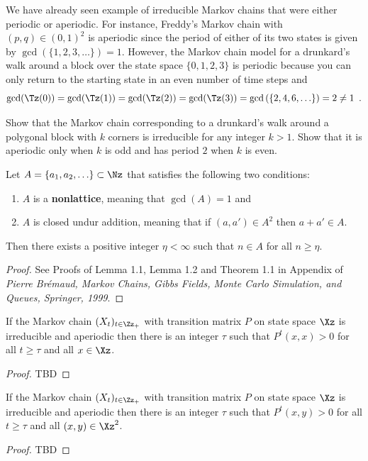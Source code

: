 We have already seen example of irreducible Markov chains that  were either periodic or aperiodic.  For instance, Freddy's Markov chain with $(p,q) \in (0,1)^2$ is aperiodic since the period of either of its two states is given by $\gcd(\{1,2,3,\ldots\})=1$.  However, the Markov chain model for a drunkard's walk around a block over the state space $\{0,1,2,3\}$ %
is periodic because you can only return to the starting state in an even number of time steps and 
$$
\gcd(\Tz(0))=\gcd(\Tz(1))=\gcd(\Tz(2))=\gcd(\Tz(3))= \gcd \left( \{2,4,6,\ldots\} \right) =2 \neq 1 \enspace .
$$

\begin{exercise}\label{EXR:DrunkardsWalkOnKGonIrredAperiod}
Show that the Markov chain corresponding to a drunkard's walk around a polygonal block with $k$ corners is irreducible for any integer $k>1$.  Show that it is aperiodic only when $k$ is odd and has period $2$ when $k$ is even.
\end{exercise}

\begin{prop}\label{P:AdditionNonlattice} Let $A=\{a_1,a_2,\ldots\} \subset \Nz$ that satisfies the following two conditions:
\begin{enumerate}
\item $A$ is a {\bf nonlattice}, meaning that $\gcd(A)=1$ and
\item $A$ is closed undur addition, meaning that if $(a,a') \in A^2$ then $a+a' \in A$.
\end{enumerate}
Then there exists a positive integer $\eta < \infty$ such that $n \in A$ for all $n \geq \eta$.
\begin{proof}
See Proofs of Lemma 1.1, Lemma 1.2 and Theorem 1.1 in Appendix of {\em Pierre Br\'emaud, Markov Chains, Gibbs Fields, Monte Carlo Simulation, and Queues, Springer, 1999}.
\end{proof}
\end{prop}

\begin{prop}
If the Markov chain $(X_t)_{t\in\Zz_+}$ with transition matrix $P$ on state space $\Xz$ is irreducible and aperiodic then there is an integer $\tau$ such that $P^t(x,x)>0$ for all $t \geq \tau$ and all $x \in \Xz$.
\begin{proof}
TBD
\end{proof}
\end{prop}

\begin{prop}
If the Markov chain $(X_t)_{t\in\Zz_+}$ with transition matrix $P$ on state space $\Xz$ is irreducible and aperiodic then there is an integer $\tau$ such that $P^t(x,y)>0$ for all $t \geq \tau$ and all $(x,y) \in \Xz^2$.
\begin{proof}
TBD
\end{proof}
\end{prop}

